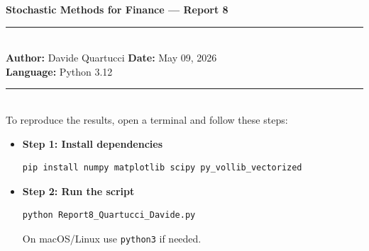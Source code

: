\documentclass{report}
\begin{document}
\pagestyle{fancy}
\fancyhf{}
\renewcommand{\headrulewidth}{0.4pt}
\setlength{\headheight}{14pt}
\thispagestyle{plain}

\begin{flushleft}
    {\large \textbf{Stochastic Methods for Finance --- Report 8}} \\
    \rule{\textwidth}{0.4pt} \\
    \textbf{Author:} Davide Quartucci \hfill \textbf{Date:} May 09, 2026 \\
    \textbf{Language:} Python 3.12
\end{flushleft}

\begin{center}
\end{center}

\rule{\textwidth}{0.4pt}\\[2mm]
To reproduce the results, open a terminal and follow these steps:
\begin{itemize}
    \item \textbf{Step 1: Install dependencies}
    \begin{verbatim}
pip install numpy matplotlib scipy py_vollib_vectorized
    \end{verbatim}

    \item \textbf{Step 2: Run the script}
    \begin{verbatim}
python Report8_Quartucci_Davide.py
    \end{verbatim}
    On macOS/Linux use \texttt{python3} if needed.
\end{itemize}
\end{document}
